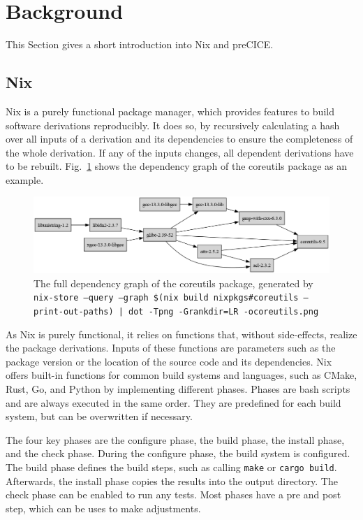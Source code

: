 \documentclass{eceasst}
\begin{document}
\section{Background}
\label{sec:background}

This Section gives a short introduction into Nix and preCICE.

\subsection{Nix}\label{sec:nix}

Nix is a purely functional package manager, which provides features to build software derivations reproducibly.
It does so, by recursively calculating a hash over all inputs of a derivation and its dependencies to ensure the completeness of the whole derivation.
If any of the inputs changes, all dependent derivations have to be rebuilt.
Fig.~\ref{fig:nix-graph} shows the dependency graph of the coreutils package as an example.

\begin{figure}
    \centering
    \includegraphics[width=1\textwidth]{figures/coreutils.png}
    \caption{The full dependency graph of the coreutils package, generated by \texttt{nix-store --query --graph \$(nix build nixpkgs\#coreutils --print-out-paths) | dot -Tpng -Grankdir=LR -ocoreutils.png}}
    \label{fig:nix-graph}
\end{figure}

As Nix is purely functional, it relies on functions that, without side-effects, realize the package derivations.
Inputs of these functions are parameters such as the package version or the location of the source code and its dependencies.
Nix offers built-in functions for common build systems and languages, such as CMake, Rust, Go, and Python by implementing different phases.
Phases are bash scripts and are always executed in the same order. They are predefined for each build system, but can be overwritten if necessary.

The four key phases are the configure phase, the build phase, the install phase, and the check phase.
During the configure phase, the build system is configured.
The build phase defines the build steps, such as calling \texttt{make} or \texttt{cargo build}.
Afterwards, the install phase copies the results into the output directory.
The check phase can be enabled to run any tests.
Most phases have a pre and post step, which can be uses to make adjustments.
\end{document}
